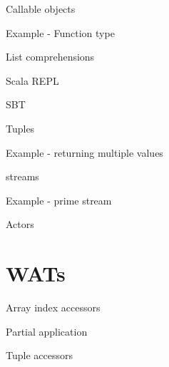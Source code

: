 \documentclass{beamer}
\begin{document}
\begin{frame}{Callable objects}
\end{frame}

\begin{frame}{Example - Function type}
\end{frame}

\begin{frame}{List comprehensions}
\end{frame}

\begin{frame}{Scala REPL}
\end{frame}

\begin{frame}{SBT}
\end{frame}

\begin{frame}{Tuples}
\end{frame}

\begin{frame}{Example - returning multiple values}
\end{frame}

\begin{frame}{streams}
\end{frame}

\begin{frame}{Example - prime stream}
\end{frame}

\begin{frame}{Actors}
\end{frame}

\section{WATs}

\begin{frame}{Array index accessors}
\end{frame}

\begin{frame}{Partial application}
\end{frame}

\begin{frame}{Tuple accessors}
\end{frame}
\end{document}
